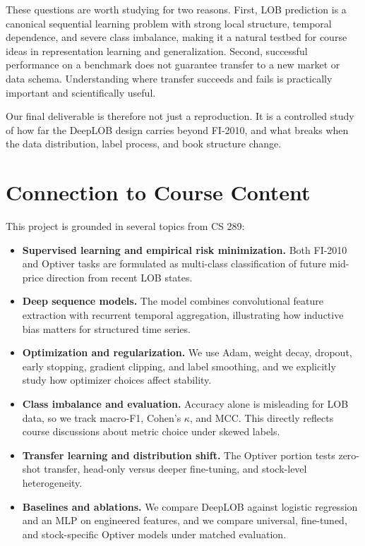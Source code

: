 \documentclass[11pt]{article}
\begin{document}
These questions are worth studying for two reasons. First, LOB prediction is a canonical sequential learning problem with strong local structure, temporal dependence, and severe class imbalance, making it a natural testbed for course ideas in representation learning and generalization. Second, successful performance on a benchmark does not guarantee transfer to a new market or data schema. Understanding where transfer succeeds and fails is practically important and scientifically useful.

Our final deliverable is therefore not just a reproduction. It is a controlled study of how far the DeepLOB design carries beyond FI-2010, and what breaks when the data distribution, label process, and book structure change.

\section{Connection to Course Content}
This project is grounded in several topics from CS 289:
\begin{itemize}[leftmargin=*]
    \item \textbf{Supervised learning and empirical risk minimization.} Both FI-2010 and Optiver tasks are formulated as multi-class classification of future mid-price direction from recent LOB states.
    \item \textbf{Deep sequence models.} The model combines convolutional feature extraction with recurrent temporal aggregation, illustrating how inductive bias matters for structured time series.
    \item \textbf{Optimization and regularization.} We use Adam, weight decay, dropout, early stopping, gradient clipping, and label smoothing, and we explicitly study how optimizer choices affect stability.
    \item \textbf{Class imbalance and evaluation.} Accuracy alone is misleading for LOB data, so we track macro-F1, Cohen's $\kappa$, and MCC. This directly reflects course discussions about metric choice under skewed labels.
    \item \textbf{Transfer learning and distribution shift.} The Optiver portion tests zero-shot transfer, head-only versus deeper fine-tuning, and stock-level heterogeneity.
    \item \textbf{Baselines and ablations.} We compare DeepLOB against logistic regression and an MLP on engineered features, and we compare universal, fine-tuned, and stock-specific Optiver models under matched evaluation.
\end{itemize}
\end{document}
